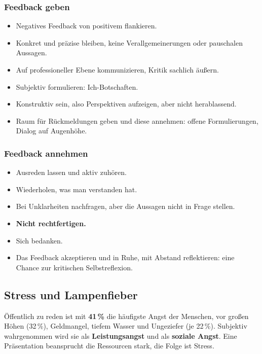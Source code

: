 \documentclass[12pt, a4paper]{article}
\begin{document}
\subsubsection{Feedback geben}

\begin{itemize}
  \item Negatives Feedback von positivem flankieren.
  \item Konkret und präzise bleiben, keine Verallgemeinerungen oder
        pauschalen Aussagen.
  \item Auf professioneller Ebene kommunizieren, Kritik sachlich äußern.
  \item Subjektiv formulieren: \glqq Ich-Botschaften\grqq{}.
  \item Konstruktiv sein, also Perspektiven aufzeigen, aber nicht
        herablassend.
  \item Raum für Rückmeldungen geben und diese annehmen: offene
        Formulierungen, Dialog auf Augenhöhe.
\end{itemize}

\subsubsection{Feedback annehmen}

\begin{itemize}
  \item Ausreden lassen und aktiv zuhören.
  \item Wiederholen, was man verstanden hat.
  \item Bei Unklarheiten nachfragen, aber die Aussagen nicht in Frage
        stellen.
  \item \textbf{Nicht rechtfertigen.}
  \item Sich bedanken.
  \item Das Feedback akzeptieren und in Ruhe, mit Abstand reflektieren: eine
        Chance zur kritischen Selbstreflexion.
\end{itemize}

\subsection{Stress und Lampenfieber}

Öffentlich zu reden ist mit \textbf{41\,\%} die häufigste Angst der Menschen,
vor großen Höhen (32\,\%), Geldmangel, tiefem Wasser und Ungeziefer (je
22\,\%). Subjektiv wahrgenommen wird sie als \textbf{Leistungsangst} und als
\textbf{soziale Angst}. Eine Präsentation beansprucht die Ressourcen stark,
die Folge ist Stress.
\end{document}
